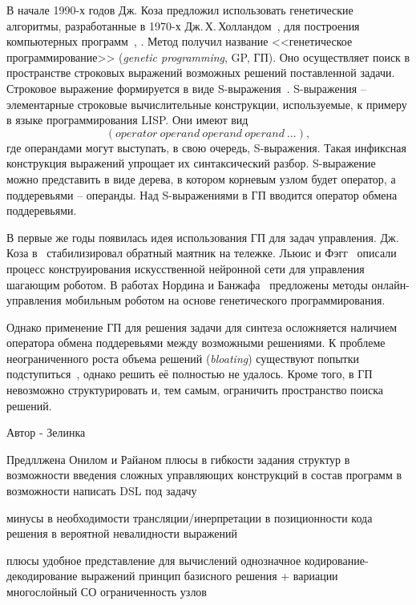 В начале 1990-х годов Дж. Коза предложил использовать генетические алгоритмы, разработанные в 1970-х Дж.\,Х.\,Холландом~\cite{Holland1973, Holland1975}, для построения компьютерных программ~\cite{Koza1990, Koza1990a, Koza1992a}, .
Метод получил название <<генетическое программирование>> (\textit{genetic programming}, GP, ГП).
Оно осуществляет поиск в пространстве строковых выражений возможных решений поставленной задачи.
Строковое выражение формируется в виде S-выражения~\cite{McCarthy1960}.
S-выражения -- элементарные строковые вычислительные конструкции, используемые, к примеру в языке программирования LISP. 
Они имеют вид 
\begin{equation}
    \left(operator\ operand\ operand\ operand\ ...\right),
    \label{intro:s_expression}
\end{equation}
где операндами могут выступать, в свою очередь, S-выражения.
Такая инфиксная конструкция выражений упрощает их синтаксический разбор.
S-выражение можно представить в виде дерева, в котором корневым узлом будет оператор, а поддеревьями -- операнды.
Над S-выражениями в ГП вводится оператор обмена поддеревьями.

В первые же годы появилась идея использования ГП для задач управления.
Дж. Коза в~\cite{Koza1992} стабилизировал обратный маятник на тележке.
Льюис и Фэгг~\cite{Lewis1992} описали процесс конструирования искусственной нейронной сети для управления шагающим роботом.
В работах Нордина и Банжафа~\cite{Nordin1996, Nordin1997} предложены методы онлайн-управления мобильным роботом на основе генетического программирования.

Однако применение ГП для решения задачи для синтеза осложняется наличием оператора обмена поддеревьями между возможными решениями. 
К проблеме неограниченного роста объема решений (\textit{bloating}) существуют попытки подступиться~\cite{Trujillo2016}, однако решить её полностью не удалось.
Кроме того, в ГП невозможно структурировать и, тем самым, ограничить пространство поиска решений.

Автор - Зелинка


Предллжена Онилом и Райаном
плюсы
в гибкости задания структур
в возможности введения сложных управляющих конструкций в состав программ
в возможности написать DSL под задачу

минусы
в необходимости трансляции/инерпретации
в позиционности кода решения
в вероятной невалидности выражений

плюсы
удобное представление для вычислений
однозначное кодирование-декодирование выражений
принцип базисного решения + вариации
многослойный СО
ограниченность узлов


